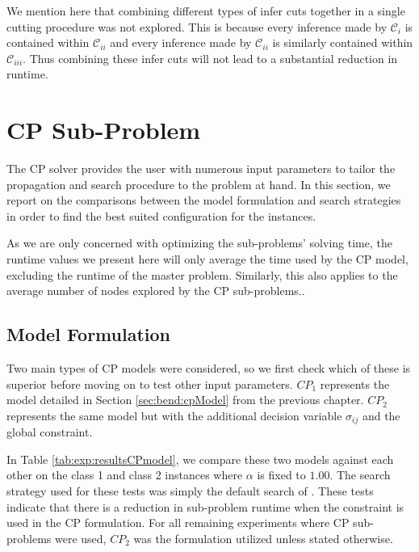 We mention here that combining different 
types of infer cuts together in a single cutting procedure
was not explored.
This is because every inference made by $\mathcal{C}_{i}$ is 
contained within $\mathcal{C}_{ii}$ and every inference made by $\mathcal{C}_{ii}$
is similarly contained within $\mathcal{C}_{iii}$.
Thus combining these infer cuts will not lead to a
substantial reduction in runtime.

\section{CP Sub-Problem}
\label{sec:exp:cp}
The CP solver \chuffed provides the
user with numerous input parameters to
tailor the propagation and search procedure 
to the problem at hand.
In this section, we report on the comparisons
between the model formulation
and search strategies in order to find the best suited
configuration for the  instances.

As we are only concerned with optimizing the sub-problems'
solving time, the runtime values we present here will
only average the time used by the CP model, 
\ie excluding the runtime of the master problem.
Similarly, this also applies to the average number of nodes
explored by the CP sub-problems..


\subsection{Model Formulation}
\label{sec:exp:cpForm}
Two main types of CP models were considered, so we
first check which of these is superior before moving
on to test other input parameters.
$CP_1$ represents the model detailed in Section \ref{sec:bend:cpModel}
from the previous chapter.
$CP_2$ represents the same model but with the additional decision
variable $\sigma_{ij}$ and the \cumu global constraint.

In Table \ref{tab:exp:resultsCPmodel}, we compare these two models 
against each other on the class 1 and
class 2 instances where $\alpha$ is fixed to $1.00$.
The search strategy used for these tests was simply the default
search of \chuffed.
These tests indicate that there is a reduction
in sub-problem runtime when the \cumu constraint
is used in the CP formulation.
For all remaining experiments where CP sub-problems
were used, $CP_2$ was the formulation utilized
unless stated otherwise.

